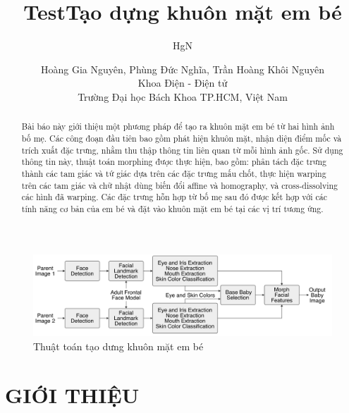 \documentclass[journal]{IEEEtran}
\title{Test}
\author{HgN}
\begin{document}
\title{Tạo dựng khuôn mặt em bé \cite{ref:r0}}
\author{Hoàng Gia Nguyên, Phùng Đức Nghĩa, Trần Hoàng Khôi Nguyên\\
Khoa Điện - Điện tử\\
Trường Đại học Bách Khoa TP.HCM, Việt Nam\\}

\maketitle

\begin{center}
    \begin{figure}[!ht]
    \begin{center}
     \includegraphics[scale=1]{Images/44}
    \end{center}
    \caption{Thuật toán tạo dưng khuôn mặt em bé}
    \label{refhinh1}
    \end{figure}
\end{center}

\begin{abstract}

Bài báo này giới thiệu một phương pháp để tạo ra khuôn mặt em bé từ hai hình ảnh bố mẹ. Các công đoạn đầu tiên bao gồm phát hiện khuôn mặt, nhận diện điểm mốc và trích xuất đặc trưng, nhằm thu thập thông tin liên quan từ mỗi hình ảnh gốc. Sử dụng thông tin này, thuật toán morphing được thực hiện, bao gồm: phân tách đặc trưng thành các tam giác và tứ giác dựa trên các đặc trưng mấu chốt, thực hiện warping trên các tam giác và chữ nhật dùng biến đổi affine và homography, và cross-dissolving các hình đã warping. Các đặc trưng hỗn hợp từ bố mẹ sau đó được kết hợp với các tính năng cơ bản của em bé và đặt vào khuôn mặt em bé tại các vị trí tương ứng.

\end{abstract}

\IEEEpeerreviewmaketitle

\section{GIỚI THIỆU}
\end{document}
